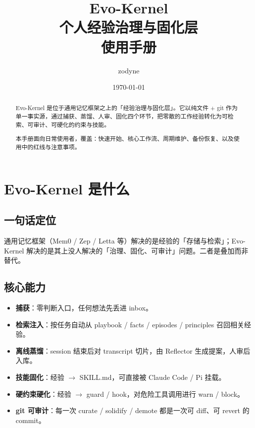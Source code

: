 \documentclass[12pt,a4paper]{ctexart}
\title{
  \vspace{-2cm}
  \textbf{Evo-Kernel}\\[0.3em]
  \Large 个人经验治理与固化层\\[0.2em]
  \large 使用手册
}
\author{zodyne}
\date{\today}
\begin{document}
\maketitle
\thispagestyle{empty}

\begin{abstract}
\noindent
Evo-Kernel 是位于通用记忆框架之上的「经验治理与固化层」。它以纯文件 + git 作为单一事实源，通过捕获、蒸馏、人审、固化四个环节，把零散的工作经验转化为可检索、可审计、可硬化的约束与技能。

本手册面向日常使用者，覆盖：快速开始、核心工作流、周期维护、备份恢复、以及使用中的红线与注意事项。
\end{abstract}

\tableofcontents
\newpage

\section{Evo-Kernel 是什么}

\subsection{一句话定位}

通用记忆框架（Mem0 / Zep / Letta 等）解决的是经验的「存储与检索」；Evo-Kernel 解决的是其上没人解决的「治理、固化、可审计」问题。二者是叠加而非替代。

\subsection{核心能力}

\begin{itemize}
  \item \textbf{捕获}：零判断入口，任何想法先丢进 inbox。
  \item \textbf{检索注入}：按任务自动从 playbook / facts / episodes / principles 召回相关经验。
  \item \textbf{离线蒸馏}：session 结束后对 transcript 切片，由 Reflector 生成提案，人审后入库。
  \item \textbf{技能固化}：经验 $\rightarrow$ SKILL.md，可直接被 Claude Code / Pi 挂载。
  \item \textbf{硬约束硬化}：经验 $\rightarrow$ guard / hook，对危险工具调用进行 warn / block。
  \item \textbf{git 可审计}：每一次 curate / solidify / demote 都是一次可 diff、可 revert 的 commit。
\end{itemize}
\end{document}
